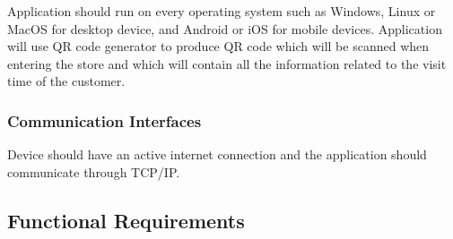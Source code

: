
Application should run on every operating system such as Windows, Linux or MacOS for desktop device, and Android or iOS for mobile devices. Application will use QR code generator to produce QR code which will be scanned when entering the store and which will contain all the information related to the visit time of the customer.

\subsubsection{Communication Interfaces}

Device should have an active internet connection and the application should communicate through TCP/IP.

\subsection{Functional Requirements}




